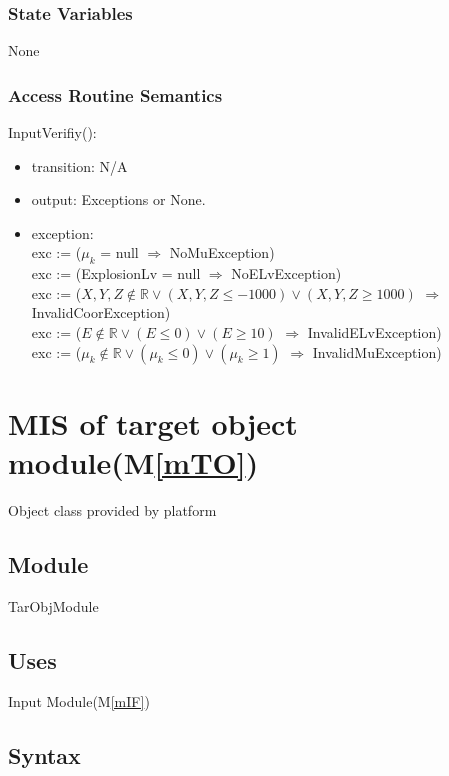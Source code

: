 \documentclass[12pt, titlepage]{article}
\newcommand{\mref}[1]{M\ref{#1}}
\begin{document}
\subsubsection{State Variables}
None
\subsubsection{Access Routine Semantics}

\noindent InputVerifiy():
\begin{itemize}
\item transition: N/A
\item output: Exceptions or None.
\item exception:\\
exc := ($\mu_{k}$ = null $\Rightarrow $ NoMuException)\\
exc := (ExplosionLv = null $\Rightarrow $ NoELvException)\\
exc := ($X,Y,Z \notin \mathbb{R} \vee (X,Y,Z \le -1000) \vee (X,Y,Z \ge 1000)$ $\Rightarrow $ InvalidCoorException)\\
exc := ($E \notin \mathbb{R} \vee (E \leq 0) \vee (E \geq 10)$ $\Rightarrow $ InvalidELvException)\\
exc := ($\mu_{k} \notin \mathbb{R} \vee (\mu_{k} \le 0) \vee (\mu_{k} \ge 1)$ $\Rightarrow $ InvalidMuException)\\
\end{itemize}

\section{MIS of target object module(\mref{mTO})}

Object class provided by platform

\subsection{Module}

TarObjModule

\subsection{Uses}

Input Module(\mref{mIF})

\subsection{Syntax}
\end{document}
